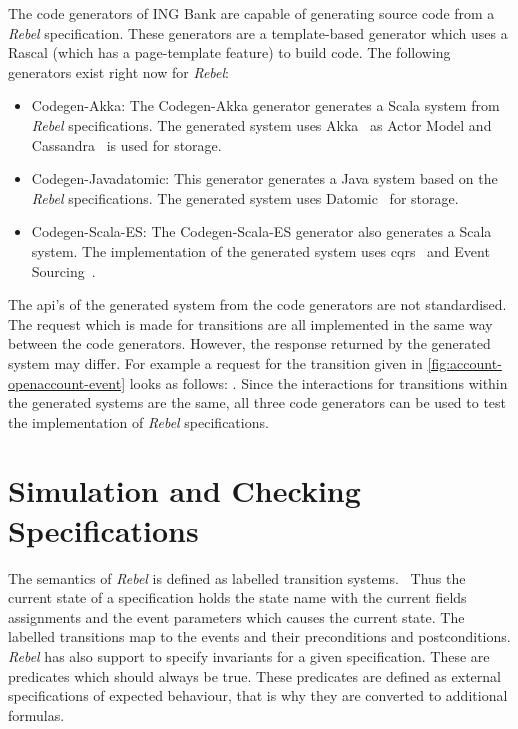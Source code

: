 The code generators of ING Bank are capable of generating source code from a \textit{Rebel} specification. These generators are a template-based generator which uses a Rascal (which has a page-template feature)\cite{RascalGTTSE} to build code. The following generators exist right now for \textit{Rebel}:
\begin{itemize}

\item Codegen-Akka: The Codegen-Akka generator generates a Scala system from
\textit{Rebel} specifications. The generated system uses
Akka~\cite[p.~4]{roestenburg2016akka} as Actor Model and
Cassandra~\cite{lakshman2010cassandra} is used for storage.

\item Codegen-Javadatomic: This generator generates a Java system based on the
\textit{Rebel} specifications. The generated system uses
Datomic~\cite[p.~170-172]{anderson2016professional} for storage.

\item Codegen-Scala-ES: The Codegen-Scala-ES generator also generates a Scala
system. The implementation of the generated system uses
\gls{cqrs}~\cite{fowler2011cqrs} and Event Sourcing~\cite{fowler2005event}.

\end{itemize}

The \gls{api}'s of the generated system from the code generators are not standardised. The request which is made for transitions are all implemented in the same way between the code generators. However, the response returned by the generated system may differ. For example a request for the transition given in \autoref{fig:account-openaccount-event} looks as follows: . Since the interactions for transitions within the generated systems are the same, all three code generators can be used to test the implementation of \textit{Rebel} specifications.

\section{Simulation and Checking Specifications}


The semantics of \textit{Rebel} is defined as labelled transition systems.~\cite[p.~5]{stoel_storm_vinju_bosman_2016} Thus the current state of a specification holds the state name with the current fields assignments and the event parameters which causes the current state. The labelled transitions map to the events and their preconditions and postconditions. \textit{Rebel} has also support to specify invariants for a given specification. These are predicates which should always be true. These predicates are defined as external specifications of expected behaviour, that is why they are converted to additional formulas. 


